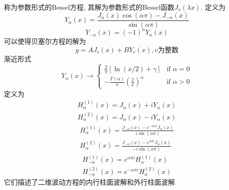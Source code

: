 \documentclass[UTF8,9pt]{ctexart}
\begin{document}
称为参数形式的Bessel方程, 其解为参数形式的Bessel函数$J_{\nu}(\lambda x)$.
定义为$$ 
Y_{\alpha}(x)=\frac{J_{\alpha}(x) \cos (\alpha \pi)-J_{-\alpha}(x)}{\sin (\alpha \pi)}
$$
$$ 
Y_{-n}(x)=(-1)^{n} Y_{n}(x)
$$
可以使得贝塞尔方程的解为
$$ 
y=A J_{v}(x)+B Y_{v}(x), v\text{为整数}
$$
渐近形式
$$Y_{\alpha }(x)\rightarrow \left\{{\begin{matrix}{\frac {2}{\pi }}\left[\ln(x/2)+\gamma \right]&{\mbox{if }}\alpha =0\\-{\frac {\Gamma (\alpha )}{\pi }}\left({\frac {2}{x}}\right)^{\alpha }&{\mbox{if }}\alpha >0\end{matrix}}\right.$$
定义为$$ 
\begin{array}{l}{H_{\alpha}^{(1)}(x)=J_{\alpha}(x)+i Y_{\alpha}(x)} \\ {H_{\alpha}^{(2)}(x)=J_{\alpha}(x)-i Y_{\alpha}(x)}\end{array}
$$
$$ 
\begin{array}{l}{H_{\alpha}^{(1)}(x)=\frac{J_{-\alpha}(x)-e^{-\alpha \pi i} J_{\alpha}(x)}{i \sin (\alpha \pi)}} \\ {H_{\alpha}^{(2)}(x)=\frac{J_{-\alpha}(x)-e^{\alpha \pi i} J_{\alpha}(x)}{-i \sin (\alpha \pi)}}\end{array}
$$
$$ 
\begin{array}{l}{H_{-\alpha}^{(1)}(x)=e^{\alpha \pi i} H_{\alpha}^{(1)}(x)} \\ {H_{-\alpha}^{(2)}(x)=e^{-\alpha \pi i} H_{\alpha}^{(2)}(x)}\end{array}
$$
它们描述了二维波动方程的内行柱面波解和外行柱面波解.
\end{document}
